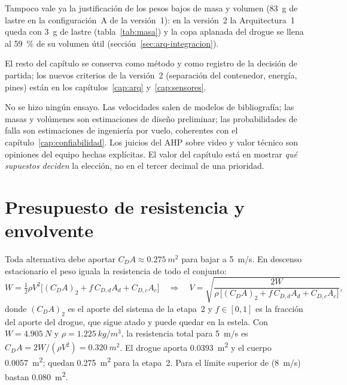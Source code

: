 \begin{nota}
Tampoco vale ya la justificación de los pesos bajos de masa y volumen (\SI{83}{g} de lastre en la configuración~A de la versión~1): en la
versión~2 la Arquitectura~1 queda con \SI{3}{g} de lastre (tabla~\ref{tab:masa}) y la copa aplanada del drogue se llena al \SI{59}{\percent} de su
volumen útil (sección~\ref{sec:arq-integracion}).

El resto del capítulo se conserva como método y como
registro de la decisión de partida; los nuevos criterios de la versión~2 (separación del contenedor, energía, pines) están en los capítulos~\ref{cap:arq} y~\ref{cap:sensores}.
\end{nota}

\begin{nota}
No se hizo ningún ensayo. Las velocidades salen de modelos de bibliografía; las masas y
volúmenes son estimaciones de diseño preliminar; las probabilidades de falla son
estimaciones de ingeniería por vuelo, coherentes con el capítulo~\ref{cap:confiabilidad}.
Los juicios del AHP sobre video y valor técnico son opiniones del equipo hechas
explícitas. El valor del capítulo está en mostrar \emph{qué supuestos deciden} la
elección, no en el tercer decimal de una prioridad.
\end{nota}

\section{Presupuesto de resistencia y envolvente}\label{sec:decision-presupuesto}
Toda alternativa debe aportar $C_DA\approx\SI{0.275}{m^2}$ para bajar a \SI{5}{m/s}. En
descenso estacionario el peso iguala la resistencia de todo el conjunto:
\begin{equation}
  W=\tfrac12\rho V^2\Big[(C_DA)_2+f\,C_{D,d}A_d+C_{D,c}A_c\Big]
  \quad\Rightarrow\quad
  V=\sqrt{\frac{2W}{\rho\,\big[(C_DA)_2+f\,C_{D,d}A_d+C_{D,c}A_c\big]}},
  \label{eq:decision-vterm}
\end{equation}
donde $(C_DA)_2$ es el aporte del sistema de la etapa~2 y $f\in[0,1]$ es la fracción del
aporte del drogue, que sigue atado y puede quedar en la estela. Con $W=\SI{4.905}{N}$ y
$\rho=\SI{1.225}{kg/m^3}$, la resistencia total para \SI{5}{m/s} es
$C_DA=2W/(\rho V^2)=\SI{0.320}{m^2}$. El drogue aporta \SI{0.0393}{m^2} y el cuerpo
\SI{0.0057}{m^2}; quedan \SI{0.275}{m^2} para la etapa~2. Para el límite superior de
 (\SI{8}{m/s}) bastan \SI{0.080}{m^2}.

